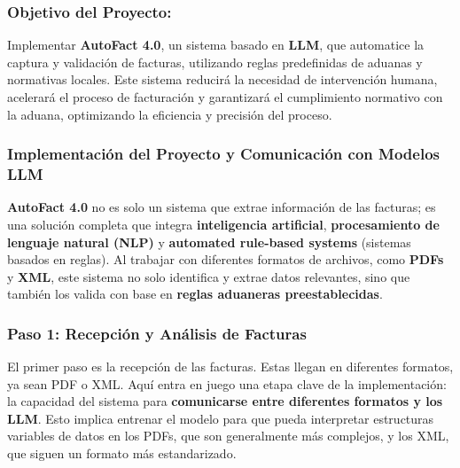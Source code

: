 \documentclass[
  10pt,
  letterpaper,
]{book}
\begin{document}
\subsubsection{Objetivo del Proyecto:}\label{objetivo-del-proyecto}

Implementar \textbf{AutoFact 4.0}, un sistema basado en \textbf{LLM},
que automatice la captura y validación de facturas, utilizando reglas
predefinidas de aduanas y normativas locales. Este sistema reducirá la
necesidad de intervención humana, acelerará el proceso de facturación y
garantizará el cumplimiento normativo con la aduana, optimizando la
eficiencia y precisión del proceso.

\subsubsection{Implementación del Proyecto y Comunicación con Modelos
LLM}\label{implementaciuxf3n-del-proyecto-y-comunicaciuxf3n-con-modelos-llm}

\textbf{AutoFact 4.0} no es solo un sistema que extrae información de
las facturas; es una solución completa que integra \textbf{inteligencia
artificial}, \textbf{procesamiento de lenguaje natural (NLP)} y
\textbf{automated rule-based systems} (sistemas basados en reglas). Al
trabajar con diferentes formatos de archivos, como \textbf{PDFs} y
\textbf{XML}, este sistema no solo identifica y extrae datos relevantes,
sino que también los valida con base en \textbf{reglas aduaneras
preestablecidas}.

\subsubsection{\texorpdfstring{\textbf{Paso 1: Recepción y Análisis de
Facturas}}{Paso 1: Recepción y Análisis de Facturas}}\label{paso-1-recepciuxf3n-y-anuxe1lisis-de-facturas}

El primer paso es la recepción de las facturas. Estas llegan en
diferentes formatos, ya sean PDF o XML. Aquí entra en juego una etapa
clave de la implementación: la capacidad del sistema para
\textbf{comunicarse entre diferentes formatos y los LLM}. Esto implica
entrenar el modelo para que pueda interpretar estructuras variables de
datos en los PDFs, que son generalmente más complejos, y los XML, que
siguen un formato más estandarizado.
\end{document}
